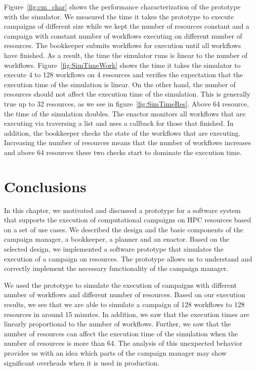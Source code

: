 Figure~\ref{fig:cm_char} shows the performance characterization of the prototype with the simulator.
We measured the time it takes the prototype to execute campaigns of different size while we kept the number of resources constant and a campaign with constant number of workflows executing on different number of resources.
The bookkeeper submits workflows for execution until all workflows have finished.
As a result, the time the simulator runs is linear to the number of workflows.
Figure~\ref{fig:SimTimeWork} shows the time it takes the simulator to execute 4 to 128 workflows on 4 resources and verifies the expectation that the execution time of the simulation is linear.
On the other hand, the number of resources should not affect the execution time of the simulation.
This is generally true up to 32 resources, as we see in figure~\ref{fig:SimTimeRes}.
Above 64 resource, the time of the simulation doubles.
The enactor monitors all workflows that are executing via traversing a list and uses a callback for those that finished.
In addition, the bookkeeper checks the state of the workflows that are executing.
Increasing the number of resources means that the number of workflows increases and above 64 resources these two checks start to dominate the execution time.


\section{Conclusions}

In this chapter, we motivated and discussed a prototype for a software system that supports the execution of computational campaigns on HPC resources based on a set of use cases.
We described the design and the basic components of the campaign manager, a bookkeeper, a planner and an enactor.
Based on the selected design, we implemented a software prototype that simulates the execution of a campaign on resources.
The prototype allows us to understand and correctly implement the necessary functionality of the campaign manager.

We used the prototype to simulate the execution of campaigns with different number of workflows and different number of resources.
Based on our execution results, we see that we are able to simulate a campaign of 128 workflows to 128 resources in around 15 minutes.
In addition, we saw that the execution times are linearly proportional to the number of workflows.
Further, we saw that the number of resources can affect the execution time of the simulation when the number of resources is more than 64.
The analysis of this unexpected behavior provides us with an idea which parts of the campaign manager may show significant overheads when it is used in production.

